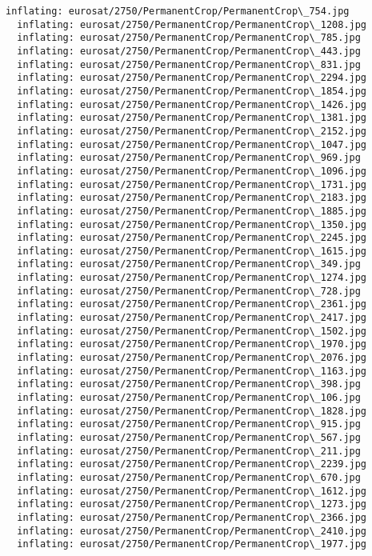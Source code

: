 \documentclass[11pt]{article}
\begin{document}
\begin{Verbatim}[commandchars=\\\{\}]
  inflating: eurosat/2750/PermanentCrop/PermanentCrop\_754.jpg
  inflating: eurosat/2750/PermanentCrop/PermanentCrop\_1208.jpg
  inflating: eurosat/2750/PermanentCrop/PermanentCrop\_785.jpg
  inflating: eurosat/2750/PermanentCrop/PermanentCrop\_443.jpg
  inflating: eurosat/2750/PermanentCrop/PermanentCrop\_831.jpg
  inflating: eurosat/2750/PermanentCrop/PermanentCrop\_2294.jpg
  inflating: eurosat/2750/PermanentCrop/PermanentCrop\_1854.jpg
  inflating: eurosat/2750/PermanentCrop/PermanentCrop\_1426.jpg
  inflating: eurosat/2750/PermanentCrop/PermanentCrop\_1381.jpg
  inflating: eurosat/2750/PermanentCrop/PermanentCrop\_2152.jpg
  inflating: eurosat/2750/PermanentCrop/PermanentCrop\_1047.jpg
  inflating: eurosat/2750/PermanentCrop/PermanentCrop\_969.jpg
  inflating: eurosat/2750/PermanentCrop/PermanentCrop\_1096.jpg
  inflating: eurosat/2750/PermanentCrop/PermanentCrop\_1731.jpg
  inflating: eurosat/2750/PermanentCrop/PermanentCrop\_2183.jpg
  inflating: eurosat/2750/PermanentCrop/PermanentCrop\_1885.jpg
  inflating: eurosat/2750/PermanentCrop/PermanentCrop\_1350.jpg
  inflating: eurosat/2750/PermanentCrop/PermanentCrop\_2245.jpg
  inflating: eurosat/2750/PermanentCrop/PermanentCrop\_1615.jpg
  inflating: eurosat/2750/PermanentCrop/PermanentCrop\_349.jpg
  inflating: eurosat/2750/PermanentCrop/PermanentCrop\_1274.jpg
  inflating: eurosat/2750/PermanentCrop/PermanentCrop\_728.jpg
  inflating: eurosat/2750/PermanentCrop/PermanentCrop\_2361.jpg
  inflating: eurosat/2750/PermanentCrop/PermanentCrop\_2417.jpg
  inflating: eurosat/2750/PermanentCrop/PermanentCrop\_1502.jpg
  inflating: eurosat/2750/PermanentCrop/PermanentCrop\_1970.jpg
  inflating: eurosat/2750/PermanentCrop/PermanentCrop\_2076.jpg
  inflating: eurosat/2750/PermanentCrop/PermanentCrop\_1163.jpg
  inflating: eurosat/2750/PermanentCrop/PermanentCrop\_398.jpg
  inflating: eurosat/2750/PermanentCrop/PermanentCrop\_106.jpg
  inflating: eurosat/2750/PermanentCrop/PermanentCrop\_1828.jpg
  inflating: eurosat/2750/PermanentCrop/PermanentCrop\_915.jpg
  inflating: eurosat/2750/PermanentCrop/PermanentCrop\_567.jpg
  inflating: eurosat/2750/PermanentCrop/PermanentCrop\_211.jpg
  inflating: eurosat/2750/PermanentCrop/PermanentCrop\_2239.jpg
  inflating: eurosat/2750/PermanentCrop/PermanentCrop\_670.jpg
  inflating: eurosat/2750/PermanentCrop/PermanentCrop\_1612.jpg
  inflating: eurosat/2750/PermanentCrop/PermanentCrop\_1273.jpg
  inflating: eurosat/2750/PermanentCrop/PermanentCrop\_2366.jpg
  inflating: eurosat/2750/PermanentCrop/PermanentCrop\_2410.jpg
  inflating: eurosat/2750/PermanentCrop/PermanentCrop\_1977.jpg

\end{Verbatim}
\end{document}
